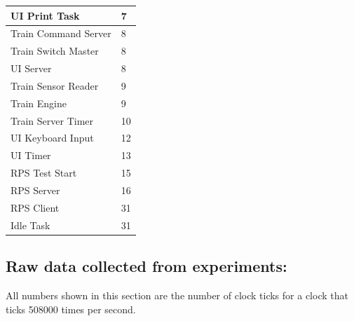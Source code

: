 \documentclass[letterpaper]{article}
\newlength{\DUtablewidth} %
\begin{document}
\begin{longtable*}[c]{|p{0.296\DUtablewidth}|p{0.133\DUtablewidth}|}
UI Print Task
 & 
7
 \\
\hline

Train Command Server
 & 
8
 \\
\hline

Train Switch Master
 & 
8
 \\
\hline

UI Server
 & 
8
 \\
\hline

Train Sensor Reader
 & 
9
 \\
\hline

Train Engine
 & 
9
 \\
\hline

Train Server Timer
 & 
10
 \\
\hline

UI Keyboard Input
 & 
12
 \\
\hline

UI Timer
 & 
13
 \\
\hline

RPS Test Start
 & 
15
 \\
\hline

RPS Server
 & 
16
 \\
\hline

RPS Client
 & 
31
 \\
\hline

Idle Task
 & 
31
 \\
\hline
\end{longtable*}


\subsection{Raw data collected from experiments:%
  \label{raw-data-collected-from-experiments}%
}

All numbers shown in this section are the number of clock ticks for a clock that ticks 508000 times per second.
\end{document}
